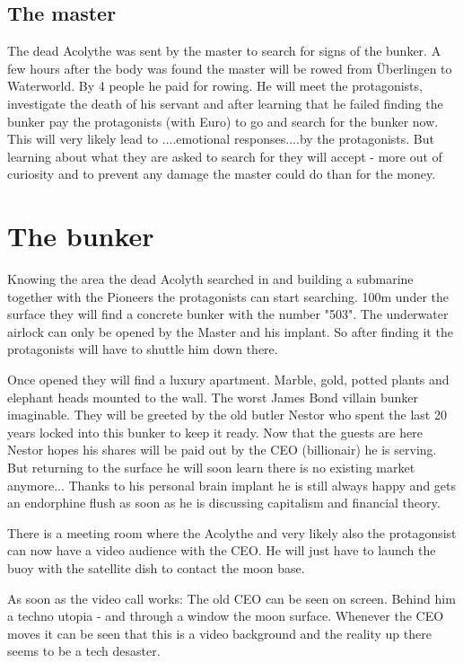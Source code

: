 \subsection{The master}

The dead Acolythe was sent by the master to search for signs of the bunker. A few hours after the body was found the master will be rowed from Überlingen to Waterworld. By 4 people he paid for rowing. He will meet the protagonists, investigate the death of his servant and after learning that he failed finding the bunker pay the protagonists (with Euro) to go and search for the bunker now.
This will very likely lead to ....emotional responses....by the protagonists. But learning about what they are asked to search for they will accept - more out of curiosity and to prevent any damage the master could do than for the money.

\section{The bunker}

Knowing the area the dead Acolyth searched in and building a submarine together with the Pioneers the protagonists can start searching. 100m under the surface they will find a concrete bunker with the number "503".
The underwater airlock can only be opened by the Master and his implant. So after finding it the protagonists will have to shuttle him down there.

Once opened they will find a luxury apartment. Marble, gold, potted plants and elephant heads mounted to the wall. The worst James Bond villain bunker imaginable. They will be greeted by the old butler Nestor who spent the last 20 years locked into this bunker to keep it ready. Now that the guests are here Nestor hopes his shares will be paid out by the CEO (billionair) he is serving. But returning to the surface he will soon learn there is no existing market anymore...
Thanks to his personal brain implant he is still always happy and gets an endorphine flush as soon as he is discussing capitalism and financial theory.

There is a meeting room where the Acolythe and very likely also the protagonsist can now have a video audience with the CEO. He will just have to launch the buoy with the satellite dish to contact the moon base.

As soon as the video call works: The old CEO can be seen on screen. Behind him a techno utopia - and through a window the moon surface. Whenever the CEO moves it can be seen that this is a video background and the reality up there seems to be a tech desaster.

